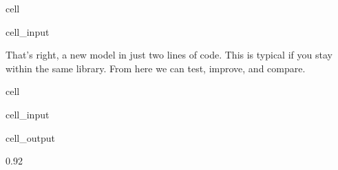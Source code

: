 \documentclass[letterpaper,10pt,english]{jupyterBook}
\begin{document}
\begin{sphinxuseclass}{cell}\begin{sphinxVerbatimInput}

\begin{sphinxuseclass}{cell_input}
\begin{sphinxVerbatim}[commandchars=\\\{\}]
   
   
\end{sphinxVerbatim}

\end{sphinxuseclass}\end{sphinxVerbatimInput}

\end{sphinxuseclass}
\sphinxAtStartPar
That’s right, a new model in just two lines of code. This is typical if you stay within the same library. From here we can test, improve, and compare.

\begin{sphinxuseclass}{cell}\begin{sphinxVerbatimInput}

\begin{sphinxuseclass}{cell_input}
\begin{sphinxVerbatim}[commandchars=\\\{\}]
  
   
\end{sphinxVerbatim}

\end{sphinxuseclass}\end{sphinxVerbatimInput}
\begin{sphinxVerbatimOutput}

\begin{sphinxuseclass}{cell_output}
\begin{sphinxVerbatim}[commandchars=\\\{\}]
0.92
\end{sphinxVerbatim}

\end{sphinxuseclass}\end{sphinxVerbatimOutput}

\end{sphinxuseclass}
\end{document}
